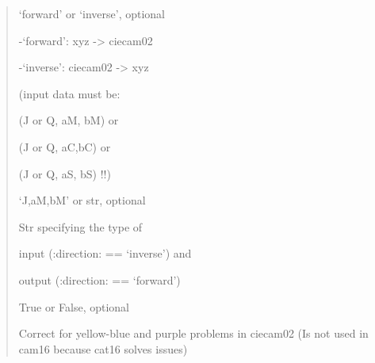 \documentclass[letterpaper,10pt,english]{sphinxmanual}
\begin{document}
\begin{fulllineitems}
\begin{description}
\begin{quote}
\begin{description}
\item[{direction}] \leavevmode
\begin{DUlineblock}{0em}
\item[] ‘forward’ or ‘inverse’, optional
\item[]
\begin{DUlineblock}{\DUlineblockindent}
\item[] -‘forward’: xyz -\textgreater{} ciecam02 
\item[] -‘inverse’: ciecam02 -\textgreater{} xyz 
\item[]
\begin{DUlineblock}{\DUlineblockindent}
\item[] (input data must be:
\item[]
\begin{DUlineblock}{\DUlineblockindent}
\item[] (J or Q, aM, bM) or 
\item[] (J or Q, aC,bC) or 
\item[] (J or Q, aS, bS) !!)
\end{DUlineblock}
\end{DUlineblock}
\end{DUlineblock}
\end{DUlineblock}

\item[{outin}] \leavevmode
\begin{DUlineblock}{0em}
\item[] ‘J,aM,bM’ or str, optional
\item[] Str specifying the type of 
\item[]
\begin{DUlineblock}{\DUlineblockindent}
\item[] input (:direction: == ‘inverse’) and 
\item[] output (:direction: == ‘forward’)
\end{DUlineblock}
\end{DUlineblock}

\item[{yellowbluepurplecorrect}] \leavevmode
\begin{DUlineblock}{0em}
\item[] True or False, optional
\item[] Correct for yellow-blue and purple problems in ciecam02 
(Is not used in cam16 because cat16 solves issues)
\end{DUlineblock}

\end{description}\end{quote}


\end{description}
\end{fulllineitems}
\end{document}
